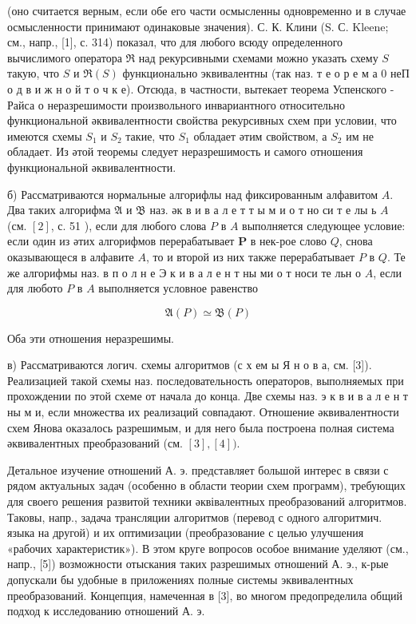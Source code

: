 \documentclass[10pt]{article}
\begin{document}
(оно считается верным, если обе его части осмысленны одновременно и в случае осмысленности принимают одинаковые значения). С. К. Клини (S. С. Kleene; см., напр., [1], с. 314) показал, что для любого всюду определенного вычислимого оператора $\mathfrak{R}$ над рекурсивными схемами можно указать схему $S$ такую, что $S$ и $\mathfrak{R}(S)$ функционально эквивалентны (так наз. т е о р е м а 0 неП о д в и ж н о й т о ч к е). Отсюда, в частности, вытекает теорема Успенского - Райса о неразрешимости произвольного инвариантного относительно функциональной әквивалентности свойства рекурсивных схем при условии, что имеются схемы $S_{1}$ и $S_{2}$ такие, что $S_{1}$ обладает әтим свойством, а $S_{2}$ им не обладает. Из әтой теоремы следует неразрешимость и самого отношения функциональной әквивалентности.



б) Рассматриваются нормальные алгорифлы над фиксированным алфавитом $A$. Два таких алгорифма $\mathfrak{A}$ и $\mathfrak{B}$ наз. әк в и в а л е т т ы м и о т но си т е лы ь $A$ (см. $[2]$, с. 51 ), если для любого слова $P$ в $A$ выполняется следующее условие: если один из әтих алгорифмов перерабатывает $\boldsymbol{P}$ в нек-рое слово $Q$, снова оказывающеся в алфавите $A$, то и второй из них также перерабатывает $P$ в $Q$. Те же алгорифмы наз. в п о л н е Э к и в а л е н т ны ми о т носи те льн о $A$, если для любото $P$ в $A$ выполняется условное равенство



\[

\mathfrak{A}(P) \simeq \mathfrak{B}(P)

\]



Оба эти отношения неразрешимы.



в) Рассматриваются логич. схемы алгоритмов (с х ем ы Я н о в а, см. [3]). Реализацией такой схемы наз. последовательность операторов, выполняемых при прохождении по этой схеме от начала до конца. Две схемы наз. э к в и в а л е н т ны м и, если множества их реализаций совпадают. Отношение әквивалентности схем Янова оказалось разрешимым, и для него была построена полная система әквивалентных преобразований (см. $[3],[4])$.



Детальное изучение отношений А. э. представляет большой интерес в связи с рядом актуальных задач (особенно в области теории схем программ), требующих для своего решения развитой техники әквівалентных преобразований алгоритмов. Таковы, напр., задача трансляции алгоритмов (перевод с одного алгоритмич. языка на другой) и их оптимизации (преобразование с целью улучшения «рабочих характеристик»). В этом круге вопросов особое внимание уделяют (см., напр., [5]) возможности отыскания таких разрешимых отношений А. э., к-рые допускали бы удобные в приложениях полные системы эквивалентных преобразований. Концепция, намеченная в [3], во многом предопределила общий подход к исследованию отношений А. э.
\end{document}
